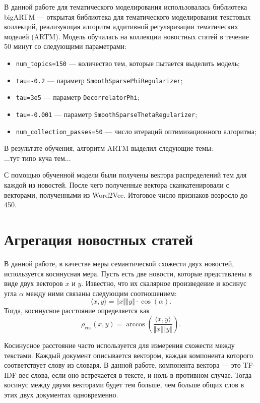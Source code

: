 \documentclass[a4paper, 14pt]{extarticle}
\begin{document}
В данной работе для тематического моделирования использовалась библиотека bigARTM \cite{bigartm} --- открытая библиотека для тематического 
моделирования текстовых коллекций, реализующая алгоритм аддитивной регуляризации тематических моделей (ARTM). Модель обучалась на коллекции
новостных статей в течение 50 минут со следующими параметрами:
\begin{itemize}
	\item \verb|num_topics=150| --- количество тем, которые пытается выделить модель;
	\item \verb|tau=-0.2| --- параметр \verb|SmoothSparsePhiRegularizer|;
	\item \verb|tau=3e5| --- параметр \verb|DecorrelatorPhi|;
	\item \verb|tau=-0.001| --- параметр \verb|SmoothSparseThetaRegularizer|;
	\item \verb|num_collection_passes=50| --- число итераций оптимизационного алгоритма;
\end{itemize}
В результате обучения, алгоритм ARTM выделил следующие темы:\\
...тут типо куча тем...

С помощью обученной модели были получены вектора распределений тем для каждой из новостей. После чего полученные вектора сканкатенировали
с векторами, полученными из Word2Vec. Итоговое число признаков возросло до 450.

\section{Агрегация новостных статей}
В данной работе, в качестве меры семантической схожести двух новостей, используется косинусная мера.
Пусть есть две новости, которые представлены в виде двух векторов $x$ и $y$. Известно, что их скалярное произведение
и косинус угла $\alpha$ между ними связаны следующим соотношением:
$$
\langle x,y \rangle = \Vert x \Vert \Vert y \Vert \cdot \cos(\alpha).
$$
Тогда, косинусное расстояние определяется как
$$
\rho_{\cos}(x, y) = \arccos\left(\frac{\langle x,y \rangle}{\Vert x \Vert \Vert y \Vert} \right).
$$

Косинусное расстояние часто используется для измерения схожести между текстами.
Каждый документ описывается вектором, каждая компонента которого соответствует слову из словаря. В данной работе, компонента
вектора --- это TF-IDF вес слова, если оно встречается в тексте, и ноль в противном случае.
Тогда косинус между двумя векторами будет тем больше, чем больше общих слов в этих двух документах одновременно.
\end{document}
